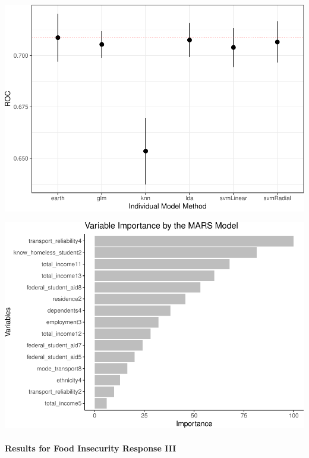 \documentclass[
  10pt,
]{article}
\begin{document}
\includegraphics{phase2_report_files/figure-latex/unnamed-chunk-15-1}

\includegraphics{phase2_report_files/figure-latex/unnamed-chunk-16-1}

\hypertarget{results-for-food-insecurity-response-iii}{%
\paragraph{Results for Food Insecurity Response III}\label{results-for-food-insecurity-response-iii}}
\end{document}
